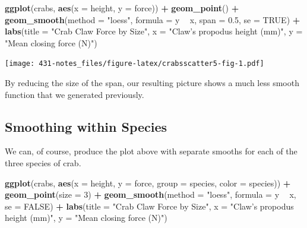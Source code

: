 \documentclass[
]{book}
\newenvironment{Shaded}{\begin{snugshade}}{\end{snugshade}}
\newcommand{\DataTypeTok}[1]{\textcolor[rgb]{0.13,0.29,0.53}{#1}}
\newcommand{\DecValTok}[1]{\textcolor[rgb]{0.00,0.00,0.81}{#1}}
\newcommand{\FloatTok}[1]{\textcolor[rgb]{0.00,0.00,0.81}{#1}}
\newcommand{\KeywordTok}[1]{\textcolor[rgb]{0.13,0.29,0.53}{\textbf{#1}}}
\newcommand{\NormalTok}[1]{#1}
\newcommand{\OperatorTok}[1]{\textcolor[rgb]{0.81,0.36,0.00}{\textbf{#1}}}
\newcommand{\OtherTok}[1]{\textcolor[rgb]{0.56,0.35,0.01}{#1}}
\newcommand{\StringTok}[1]{\textcolor[rgb]{0.31,0.60,0.02}{#1}}
\begin{document}
\begin{Shaded}
\begin{Highlighting}[]
\KeywordTok{ggplot}\NormalTok{(crabs, }\KeywordTok{aes}\NormalTok{(}\DataTypeTok{x =}\NormalTok{ height, }\DataTypeTok{y =}\NormalTok{ force)) }\OperatorTok{+}
\StringTok{    }\KeywordTok{geom_point}\NormalTok{() }\OperatorTok{+}
\StringTok{    }\KeywordTok{geom_smooth}\NormalTok{(}\DataTypeTok{method =} \StringTok{"loess"}\NormalTok{, }\DataTypeTok{formula =}\NormalTok{ y }\OperatorTok{~}\StringTok{ }\NormalTok{x, }\DataTypeTok{span =} \FloatTok{0.5}\NormalTok{, }\DataTypeTok{se =} \OtherTok{TRUE}\NormalTok{) }\OperatorTok{+}
\StringTok{    }\KeywordTok{labs}\NormalTok{(}\DataTypeTok{title =} \StringTok{"Crab Claw Force by Size"}\NormalTok{, }
         \DataTypeTok{x =} \StringTok{"Claw's propodus height (mm)"}\NormalTok{, }\DataTypeTok{y =} \StringTok{"Mean closing force (N)"}\NormalTok{)}
\end{Highlighting}
\end{Shaded}

\texttt{[image: 431-notes\_files/figure-latex/crabsscatter5-fig-1.pdf]}

By reducing the size of the span, our resulting picture shows a much less smooth function that we generated previously.

\hypertarget{smoothing-within-species}{%
\subsection{Smoothing within Species}\label{smoothing-within-species}}

We can, of course, produce the plot above with separate smooths for each of the three species of crab.

\begin{Shaded}
\begin{Highlighting}[]
\KeywordTok{ggplot}\NormalTok{(crabs, }\KeywordTok{aes}\NormalTok{(}\DataTypeTok{x =}\NormalTok{ height, }\DataTypeTok{y =}\NormalTok{ force, }\DataTypeTok{group =}\NormalTok{ species, }\DataTypeTok{color =}\NormalTok{ species)) }\OperatorTok{+}
\StringTok{    }\KeywordTok{geom_point}\NormalTok{(}\DataTypeTok{size =} \DecValTok{3}\NormalTok{) }\OperatorTok{+}
\StringTok{    }\KeywordTok{geom_smooth}\NormalTok{(}\DataTypeTok{method =} \StringTok{"loess"}\NormalTok{, }\DataTypeTok{formula =}\NormalTok{ y }\OperatorTok{~}\StringTok{ }\NormalTok{x, }\DataTypeTok{se =} \OtherTok{FALSE}\NormalTok{) }\OperatorTok{+}
\StringTok{    }\KeywordTok{labs}\NormalTok{(}\DataTypeTok{title =} \StringTok{"Crab Claw Force by Size"}\NormalTok{, }
         \DataTypeTok{x =} \StringTok{"Claw's propodus height (mm)"}\NormalTok{, }\DataTypeTok{y =} \StringTok{"Mean closing force (N)"}\NormalTok{)}
\end{Highlighting}
\end{Shaded}
\end{document}
